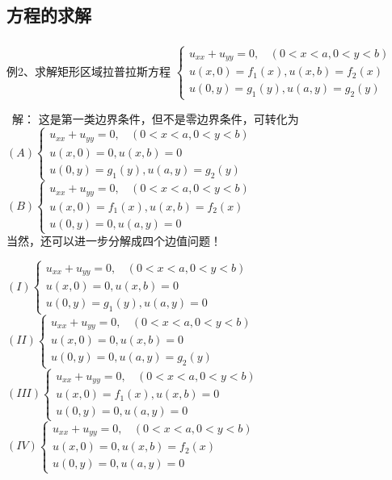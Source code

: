 \subsection{方程的求解}
\begin{frame}
	\frametitle{}
	\begin{exampleblock} {例2、求解矩形区域拉普拉斯方程}
		$\displaystyle \begin{cases}
			u_{xx} +u_{yy} =0 ,~~~~ (0<x<a, 0<y<b)\\
			u(x,0)= f_1 (x) ,  u(x,b)= f_2 (x) \\
			u(0,y)= g_1 (y) ,  u(a,y)= g_2 (y) 
		\end{cases}$ \\
	\end{exampleblock}	
	\alert{ 解：}	这是第一类边界条件，但不是零边界条件，可转化为 \\
	$\displaystyle (A) \begin{cases}
		u_{xx} +u_{yy} =0 ,~~~~ (0<x<a, 0<y<b)\\
		u(x,0)= 0,  u(x,b)= 0 \\
		u(0,y)= g_1 (y) ,  u(a,y)= g_2 (y) 
	\end{cases}$ \\
	$\displaystyle (B) \begin{cases}
		u_{xx} +u_{yy} =0 ,~~~~ (0<x<a, 0<y<b)\\
		u(x,0)= f_1 (x) ,  u(x,b)= f_2 (x) \\
		u(0,y)= 0,  u(a,y)= 0 
	\end{cases}$ \\
	当然，还可以进一步分解成四个边值问题！
\end{frame}	

\begin{frame}
	$\displaystyle  (I) \begin{cases}
		u_{xx} +u_{yy} =0 ,~~~~ (0<x<a, 0<y<b)\\
		u(x,0)= 0,  u(x,b)= 0 \\
		u(0,y)= g_1 (y) ,  u(a,y)= 0
	\end{cases}$ \\
	$\displaystyle (II)  \begin{cases}
		u_{xx} +u_{yy} =0 ,~~~~ (0<x<a, 0<y<b)\\
		u(x,0)= 0,  u(x,b)= 0 \\
		u(0,y)= 0,  u(a,y)= g_2 (y) 
	\end{cases}$ \\
	$\displaystyle  (III)  \begin{cases}
		u_{xx} +u_{yy} =0 ,~~~~ (0<x<a, 0<y<b)\\
		u(x,0)= f_1 (x) ,  u(x,b)= 0 \\
		u(0,y)= 0,  u(a,y)= 0 
	\end{cases}$ \\	
	$\displaystyle  (IV)  \begin{cases}
		u_{xx} +u_{yy} =0 ,~~~~ (0<x<a, 0<y<b)\\
		u(x,0)= 0,  u(x,b)= f_2 (x) \\
		u(0,y)= 0,  u(a,y)= 0 
	\end{cases}$ \\	
\end{frame}		

